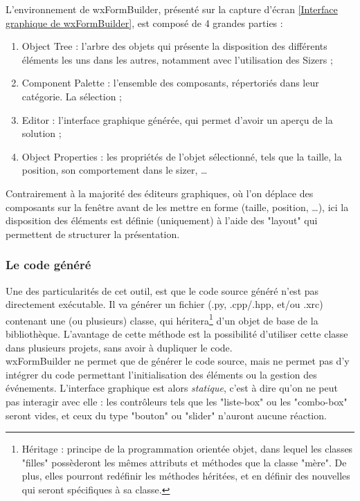 L'environnement de wxFormBuilder, présenté sur la capture d'écran \ref{Interface graphique de wxFormBuilder}, est composé de 4 grandes parties :
\begin{enumerate}
	\item Object Tree : l'arbre des objets qui présente la disposition des différents éléments les uns dans les autres, notamment avec l'utilisation des Sizers ;
	\item Component Palette : l'ensemble des composants, répertoriés dans leur catégorie. La sélection ;
	\item Editor : l'interface graphique générée, qui permet d'avoir un aperçu de la solution ;
	\item Object Properties : les propriétés de l'objet sélectionné, tels que la taille, la position, son comportement dans le sizer, \ldots
\\
\end{enumerate}


Contrairement à la majorité des éditeurs graphiques, où l'on déplace des composants sur la fenêtre avant de les mettre en forme (taille, position, \ldots), ici la disposition des éléments est définie (uniquement) à l'aide des "layout" qui permettent de structurer la présentation.
\\




\subsubsection{Le code généré}

Une des particularités de cet outil, est que le code source généré n'est pas directement exécutable.
Il va générer un fichier (.py, .cpp/.hpp, et/ou .xrc) contenant une (ou plusieurs) classe, qui héritera\footnote{Héritage : principe de la programmation orientée objet, dans lequel les classes "filles" possèderont les mêmes attributs et méthodes que la classe "mère". De plus, elles pourront redéfinir les méthodes héritées, et en définir des nouvelles qui seront spécifiques à sa classe.} d'un objet de base de la bibliothèque.
L'avantage de cette méthode est la possibilité d'utiliser cette classe dans plusieurs projets, sans avoir à dupliquer le code.
\\


wxFormBuilder ne permet que de générer le code source, mais ne permet pas d'y intégrer du code permettant l'initialisation des éléments ou la gestion des événements.
L'interface graphique est alors \textit{statique}, c'est à dire qu'on ne peut pas interagir avec elle : les contrôleurs tels que les "liste-box" ou les "combo-box" seront vides, et ceux du type "bouton" ou "slider" n'auront aucune réaction.

